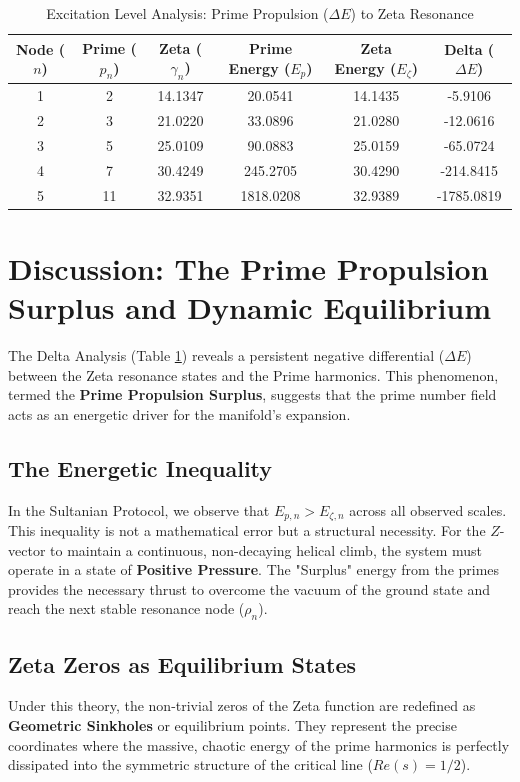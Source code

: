 \documentclass[11pt,a4paper]{article}
\begin{document}
\begin{table}[h!]
\centering
\caption{Excitation Level Analysis: Prime Propulsion ($\Delta E$) to Zeta Resonance}
\label{tab:delta_excitation}
\begin{tabular}{|c|c|c|c|c|c|}
\hline
\textbf{Node ($n$)} & \textbf{Prime ($p_n$)} & \textbf{Zeta ($\gamma_n$)} & \textbf{Prime Energy ($E_p$)} & \textbf{Zeta Energy ($E_{\zeta}$)} & \textbf{Delta ($\Delta E$)} \\ \hline
1 & 2 & 14.1347 & 20.0541 & 14.1435 & -5.9106 \\ \hline
2 & 3 & 21.0220 & 33.0896 & 21.0280 & -12.0616 \\ \hline
3 & 5 & 25.0109 & 90.0883 & 25.0159 & -65.0724 \\ \hline
4 & 7 & 30.4249 & 245.2705 & 30.4290 & -214.8415 \\ \hline
5 & 11 & 32.9351 & 1818.0208 & 32.9389 & -1785.0819 \\ \hline
\end{tabular}
\end{table}

\section{Discussion: The Prime Propulsion Surplus and Dynamic Equilibrium}

The Delta Analysis (Table \ref{tab:delta_excitation}) reveals a persistent negative differential ($\Delta E$) between the Zeta resonance states and the Prime harmonics. This phenomenon, termed the \textbf{Prime Propulsion Surplus}, suggests that the prime number field acts as an energetic driver for the manifold's expansion.

\subsection{The Energetic Inequality}
In the Sultanian Protocol, we observe that $E_{p, n} > E_{\zeta, n}$ across all observed scales. This inequality is not a mathematical error but a structural necessity. For the $Z$-vector to maintain a continuous, non-decaying helical climb, the system must operate in a state of \textbf{Positive Pressure}. The "Surplus" energy from the primes provides the necessary thrust to overcome the vacuum of the ground state and reach the next stable resonance node ($\rho_n$).

\subsection{Zeta Zeros as Equilibrium States}
Under this theory, the non-trivial zeros of the Zeta function are redefined as \textbf{Geometric Sinkholes} or equilibrium points. They represent the precise coordinates where the massive, chaotic energy of the prime harmonics is perfectly dissipated into the symmetric structure of the critical line ($Re(s)=1/2$). 
\end{document}
